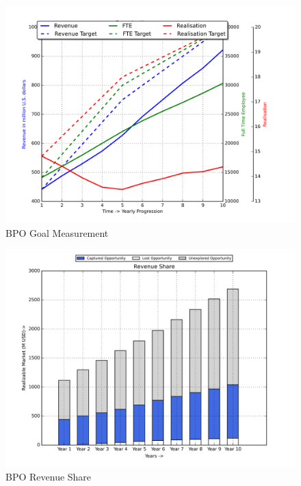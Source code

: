 \documentclass[10pt,numbers]{sigplanconf}
\begin{document}
\begin{figure}
\includegraphics[width=\columnwidth]{fte}
\caption{BPO Goal Measurement}
\label{fig:BPO_goals}
\end{figure}

\begin{figure}
\includegraphics[width=\columnwidth]{img}
\caption{BPO Revenue Share}
\label{fig:BPO_revenue_share}
\end{figure}
\end{document}
